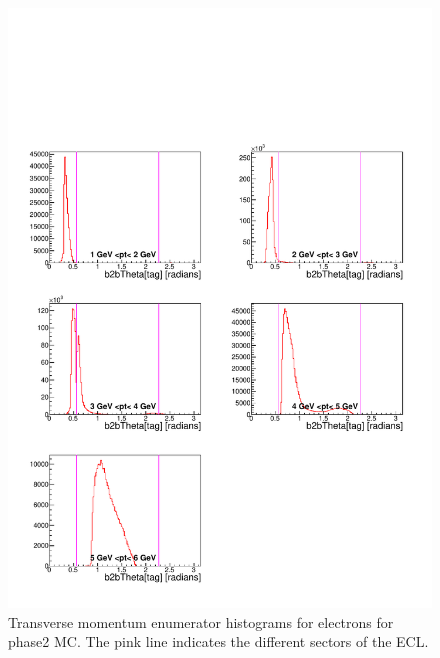 \documentclass[a4paper,11pt,twosided,final,german,openbib,pdftex,listof=totoc,bibliography=totoc]{scrbook}
\begin{document}
\begin{appendix}
\begin{figure}[!htbp]
	\centering
	\includegraphics[width=\textwidth]{Plots/master/xPtMThetaemE_MC}
	\caption[Transverse Momentum $\theta$ Electron Enumerator Histogram Phase2 MC]{Transverse momentum enumerator histograms for electrons for phase2 MC. The pink line indicates the different sectors of the ECL.}
	\label{plt:PtMThetaemE_MC}
\end{figure}


\end{appendix}
\end{document}
